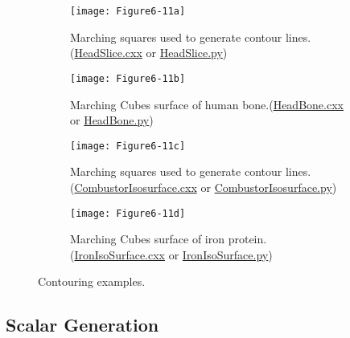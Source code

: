 \begin{figure}[htb]
	\begin{subfigure}[h]{0.48\linewidth}
		\texttt{[image: Figure6-11a]}
		\caption{Marching squares used to generate contour lines.(\href{https://lorensen.github.io/VTKExamples/site/Cxx/VisualizationAlgorithms/HeadSlice}{HeadSlice.cxx} or \href{https://lorensen.github.io/VTKExamples/site/Python/VisualizationAlgorithms/HeadSlice/}{HeadSlice.py})}\label{fig:Figure6-11a}
	\end{subfigure}
	\hfill
	\begin{subfigure}[h]{0.48\linewidth}
		\texttt{[image: Figure6-11b]}
		\caption{Marching Cubes surface of human bone.(\href{https://lorensen.github.io/VTKExamples/site/Cxx/VisualizationAlgorithms/HeadBone}{HeadBone.cxx} or \href{https://lorensen.github.io/VTKExamples/site/Python/VisualizationAlgorithms/HeadBone/}{HeadBone.py})}\label{fig:Figure6-11b}
	\end{subfigure}%
	\hfill
	\begin{subfigure}[h]{0.48\linewidth}
		\texttt{[image: Figure6-11c]}
		\caption{Marching squares used to generate contour lines.(\href{https://lorensen.github.io/VTKExamples/site/Cxx/VisualizationAlgorithms/CombustorIsosurface}{CombustorIsosurface.cxx} or \href{https://lorensen.github.io/VTKExamples/site/Python/VisualizationAlgorithms/CombustorIsosurface/}{CombustorIsosurface.py})}\label{fig:Figure6-11c}
	\end{subfigure}
	\hfill
	\begin{subfigure}[h]{0.48\linewidth}
		\texttt{[image: Figure6-11d]}
		\caption{Marching Cubes surface of iron protein.(\href{https://lorensen.github.io/VTKExamples/site/Cxx/VisualizationAlgorithms/IronIsoSurface}{IronIsoSurface.cxx} or \href{https://lorensen.github.io/VTKExamples/site/Python/VisualizationAlgorithms/IronIsoSurface/}{IronIsoSurface.py})}\label{fig:Figure6-11d}
	\end{subfigure}%
	\caption{Contouring examples.}\label{fig:Figure6-11}
\end{figure}

\subsection{Scalar Generation}
\label{subsec:scalar_generation}

